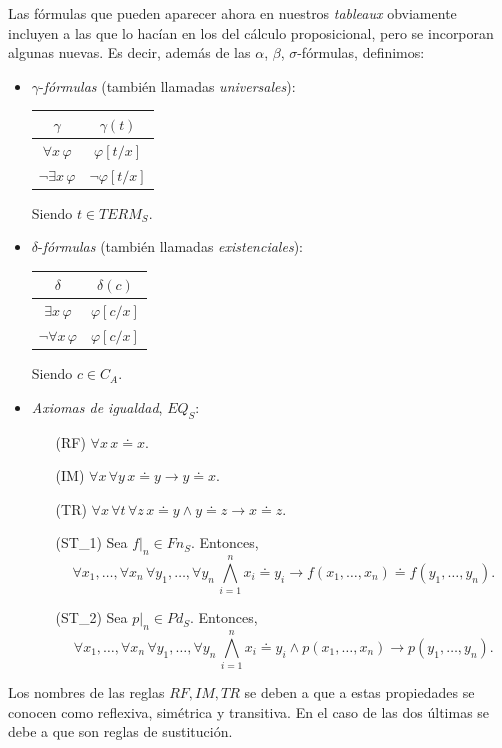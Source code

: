 Las fórmulas que pueden aparecer ahora en nuestros \textit{tableaux} obviamente incluyen a las que lo hacían en los del cálculo proposicional, pero se incorporan algunas nuevas. Es decir, además de las $\alpha$, $\beta$, $\sigma$-fórmulas, definimos:
\begin{itemize}
    \item $\gamma$-\textit{fórmulas} (también llamadas \textit{universales}):
    \begin{table}[H]
    \begin{center}
    \begin{tabular}{|c|c|}
    \hline
    $\gamma$ & $\gamma(t)$ \\
    \hline \hline
    $\forall x \, \varphi$ & $\varphi[t/x]$ \\ \hline
    $\neg \exists x \, \varphi$ & $\neg \varphi[t/x]$\\ \hline
    \end{tabular}
    \end{center}
    \end{table}
    Siendo $t \in TERM_S$.
    
    \item $\delta$-\textit{fórmulas} (también llamadas \textit{existenciales}):
    \begin{table}[H]
    \begin{center}
    \begin{tabular}{|c|c|}
    \hline
    $\delta$ & $\delta(c)$ \\
    \hline \hline
    $\exists x \, \varphi$ & $\varphi[c/x]$ \\ \hline
    $\neg \forall x \, \varphi$ & $\varphi[c/x]$\\ \hline
    \end{tabular}
    \end{center}
    \end{table}
    Siendo $c \in C_A$.
    
    \item \textit{Axiomas de igualdad}, $EQ_S$:
    \begin{itemize}
        \item[(RF)] $\forall x \, x \doteq x$.
        \item[(IM)] $\forall x \, \forall y \, x \doteq y \rightarrow y \doteq x$.
        \item[(TR)] $\forall x \, \forall t \, \forall z \, x \doteq y \land y \doteq z \rightarrow x \doteq z$.
        \item[(ST_{1})] Sea $f|_n \in Fn_S$. Entonces, $$\forall x_1, \dots, \forall x_n \, \forall y_1, \dots, \forall y_n \, \bigwedge\limits_{i = 1}^{n} x_i \doteq y_i \rightarrow f(x_1, \dots, x_n) \doteq f(y_1, \dots, y_n).$$
        \item[(ST_{2})] Sea $p|_n \in Pd_S$. Entonces, $$\forall x_1, \dots, \forall x_n \, \forall y_1, \dots, \forall y_n \, \bigwedge\limits_{i = 1}^{n} x_i \doteq y_i \land  p(x_1, \dots, x_n) \rightarrow p(y_1, \dots, y_n).$$
    \end{itemize}
\end{itemize}
Los nombres de las reglas $RF,IM,TR$ se deben a que a estas propiedades se conocen como reflexiva, simétrica y transitiva. En el caso de las dos últimas se debe a que son reglas de sustitución.

